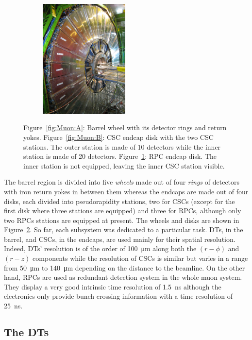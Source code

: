 \begin{figure}[H]
\begin{subfigure}{0.35\linewidth}
			\includegraphics[height = 6cm]{fig/chapt3/Disk_RPC.jpg}
			\caption{\label{fig:Muon:C}}
		\end{subfigure}
		\caption{\label{fig:Muon} Figure~\ref{fig:Muon:A}: Barrel wheel with its detector rings and return yokes. Figure~\ref{fig:Muon:B}: CSC endcap disk with the two CSC stations. The outer station is made of \SI{10}{\deg} detectors while the inner station is made of \SI{20}{\deg} detectors. Figure~\ref{fig:Muon:C}: RPC endcap disk. The inner station is not equipped, leaving the inner CSC station visible.}
	\end{figure}
	
	The barrel region is divided into five \textit{wheels} made out of four \textit{rings} of detectors with iron return yokes in between them whereas the endcaps are made out of four disks, each divided into pseudorapidity stations, two for CSCs (except for the first disk where three stations are equipped) and three for RPCs, although only two RPCs stations are equipped at present. The wheels and disks are shown in Figure~\ref{fig:Muon}. So far, each subsystem was dedicated to a particular task. DTs, in the barrel, and CSCs, in the endcaps, are used mainly for their spatial resolution. Indeed, DTs' resolution is of the order of \SI{100}{\micro m} along both the $(r-\phi)$ and $(r-z)$ components while the resolution of CSCs is similar but varies in a range from \SI{50}{\micro m} to \SI{140}{\micro m} depending on the distance to the beamline. On the other hand, RPCs are used as redundant detection system in the whole muon system. They display a very good intrinsic time resolution of \SI{1.5}{ns} although the electronics only provide bunch crossing information with a time resolution of \SI{25}{ns}.
	
	\subsection{The \acl{DT}s}
	\label{chapt3:ssec:DTs}
	
